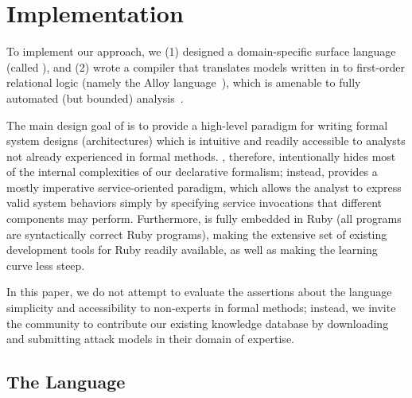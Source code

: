 \section{Implementation}
\label{sec-implementation}

To implement our approach, we (1) designed a domain-specific surface
language (called \sLangLong), and (2) wrote a compiler that translates
models written in \sLang to first-order relational logic (namely the
Alloy language~\cite{alloy}), which is amenable to fully automated
(but bounded) analysis~\cite{kodkod}.

The main design goal of \sLang is to provide a high-level paradigm for
writing formal system designs (architectures) which is intuitive and
readily accessible to analysts not already experienced in formal
methods.  \sLang, therefore, intentionally hides most of the internal
complexities of our declarative formalism; instead, \sLang provides a
mostly imperative service-oriented paradigm, which allows the analyst
to express valid system behaviors simply by specifying service
invocations that different components may perform.  Furthermore,
\sLang is fully embedded in Ruby (all \sLang programs are
syntactically correct Ruby programs), making the extensive set of
existing development tools for Ruby readily available, as well as
making the learning curve less steep.

In this paper, we do not attempt to evaluate the assertions about the
language simplicity and accessibility to non-experts in formal
methods; instead, we invite the community to contribute our existing
knowledge database by downloading \sLang~\cite{slang-web} and
submitting attack models in their domain of expertise.\check{!}

\subsection{The \sLang Language}
\label{sec-impl-slang}


